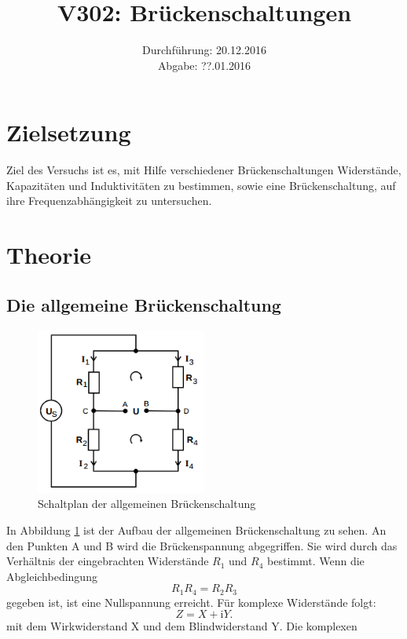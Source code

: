 \documentclass[
  bibliography=totoc,     %
  captions=tableheading,  %
  titlepage=firstiscover, %
]{scrartcl}
\title{V302: Brückenschaltungen}
\author{
  Simon Schulte
  \texorpdfstring{
    \\
    \href{mailto:simon.schulte@udo.edu}{simon.schulte@udo.edu}
  }{}
  \texorpdfstring{\and}{, }
  Tim Sedlaczek
  \texorpdfstring{
    \\
    \href{mailto:tim.sedlaczek@udo.edu}{tim.sedlaczek@udo.edu}
  }{}
}
\date{Durchführung: 20.12.2016\\
      Abgabe: ??.01.2016}
\begin{document}
\maketitle
\thispagestyle{empty}
\tableofcontents
\newpage
\section{Zielsetzung}
\label{sec:zielsetzung}
Ziel des Versuchs ist es, mit Hilfe verschiedener Brückenschaltungen Widerstände,
Kapazitäten und Induktivitäten zu bestimmen, sowie eine Brückenschaltung, auf
ihre Frequenzabhängigkeit zu untersuchen.
\section{Theorie}
\label{sec:theorie}
\subsection{Die allgemeine Brückenschaltung}
\label{sec:allgemeinebrückenschaltung}
\begin{figure}[htb]
  \centering
  \includegraphics[width=0.5\textwidth]{V3021.png}
  \caption{Schaltplan der allgemeinen Brückenschaltung}
  \label{fig:V3021}
\end{figure}
In Abbildung \ref{fig:V3021} ist der Aufbau der allgemeinen
Brückenschaltung zu sehen. An den Punkten A und B wird die Brückenspannung abgegriffen.
Sie wird durch das Verhältnis der eingebrachten Widerstände $R_1$ und $R_4$
bestimmt.
Wenn die Abgleichbedingung
\begin{equation}
    R_1 R_4 = R_2 R_3
    \label{eq:abgleich}
\end{equation}
gegeben ist, ist eine Nullspannung erreicht. Für komplexe Widerstände folgt:
\begin{equation}
    Z = X + \mathup{i}Y.
\end{equation}
mit dem Wirkwiderstand X und dem Blindwiderstand Y. Die komplexen
\end{document}
